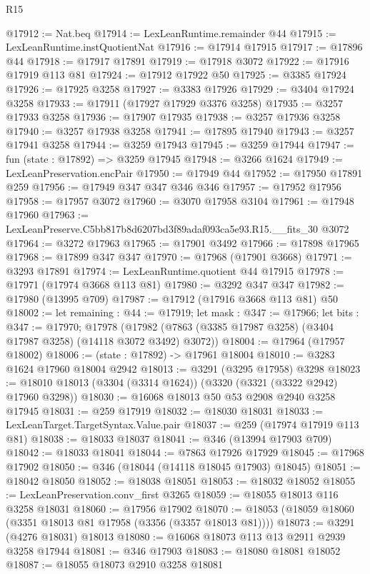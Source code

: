 \begin{lexlean}{R15}
\begin{coremodule}
@17912 := Nat.beq
@17914 := LexLeanRuntime.remainder @44
@17915 := LexLeanRuntime.instQuotientNat
@17916 := @17914 @17915
@17917 := @17896 @44
@17918 := @17917 @17891
@17919 := @17918 @3072
@17922 := @17916 @17919 @113 @81
@17924 := @17912 @17922 @50
@17925 := @3385 @17924
@17926 := @17925 @3258
@17927 := @3383 @17926
@17929 := @3404 @17924 @3258
@17933 := @17911 (@17927 @17929 @3376 @3258)
@17935 := @3257 @17933 @3258
@17936 := @17907 @17935
@17938 := @3257 @17936 @3258
@17940 := @3257 @17938 @3258
@17941 := @17895 @17940
@17943 := @3257 @17941 @3258
@17944 := @3259 @17943
@17945 := @3259 @17944
@17947 := fun (state : @17892) => @3259 @17945
@17948 := @3266 @1624
@17949 := LexLeanPreservation.encPair
@17950 := @17949 @44
@17952 := @17950 @17891 @259
@17956 := @17949 @347 @347 @346 @346
@17957 := @17952 @17956
@17958 := @17957 @3072
@17960 := @3070 @17958 @3104
@17961 := @17948 @17960
@17963 := LexLeanPreserve.C5bb817b8d6207bd3f89adaf093ca5e93.R15.__fits_30 @3072
@17964 := @3272 @17963
@17965 := @17901 @3492
@17966 := @17898 @17965
@17968 := @17899 @347 @347
@17970 := @17968 (@17901 @3668)
@17971 := @3293 @17891
@17974 := LexLeanRuntime.quotient @44 @17915
@17978 := @17971 (@17974 @3668 @113 @81)
@17980 := @3292 @347 @347
@17982 := @17980 (@13995 @709)
@17987 := @17912 (@17916 @3668 @113 @81) @50
@18002 := let remaining : @44 := @17919;
  let mask : @347 := @17966;
  let bits : @347 := @17970;
  @17978 (@17982 (@7863 (@3385 @17987 @3258) (@3404 @17987 @3258) (@14118 @3072 @3492) @3072))
@18004 := @17964 (@17957 @18002)
@18006 := (state : @17892) -> @17961 @18004
@18010 := @3283 @1624 @17960 @18004 @2942
@18013 := @3291 (@3295 @17958) @3298
@18023 := @18010 @18013 (@3304 (@3314 @1624)) (@3320 (@3321 (@3322 @2942) @17960 @3298))
@18030 := @16068 @18013 @50 @53 @2908 @2940 @3258 @17945
@18031 := @259 @17919
@18032 := @18030 @18031
@18033 := LexLeanTarget.TargetSyntax.Value.pair
@18037 := @259 (@17974 @17919 @113 @81)
@18038 := @18033 @18037
@18041 := @346 (@13994 @17903 @709)
@18042 := @18033 @18041
@18044 := @7863 @17926 @17929
@18045 := @17968 @17902
@18050 := @346 (@18044 (@14118 @18045 @17903) @18045)
@18051 := @18042 @18050
@18052 := @18038 @18051
@18053 := @18032 @18052
@18055 := LexLeanPreservation.conv_first @3265
@18059 := @18055 @18013 @116 @3258 @18031
@18060 := @17956 @17902
@18070 := @18053 (@18059 @18060 (@3351 @18013 @81 @17958 (@3356 (@3357 @18013 @81))))
@18073 := @3291 (@4276 @18031) @18013
@18080 := @16068 @18073 @113 @13 @2911 @2939 @3258 @17944
@18081 := @346 @17903
@18083 := @18080 @18081 @18052
@18087 := @18055 @18073 @2910 @3258 @18081

\end{coremodule}
\end{lexlean}
